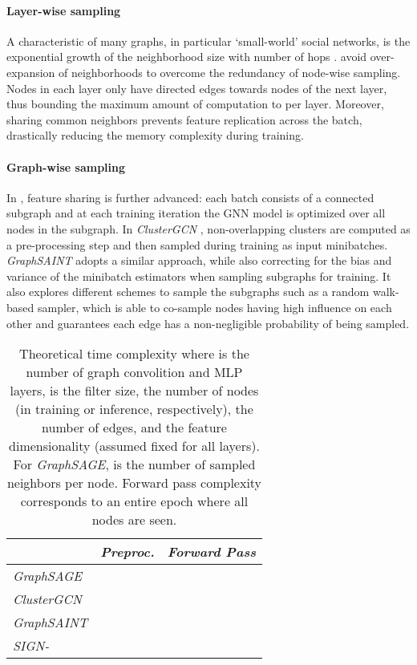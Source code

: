\documentclass{article}
\begin{document}
\paragraph{Layer-wise sampling} A characteristic of many graphs, in particular `small-world'  social networks, is the exponential growth of the neighborhood size with number of hops . \cite{fastgcn, adaptive-sampling} avoid over-expansion of neighborhoods to overcome the redundancy of node-wise sampling. Nodes in each layer only have directed edges towards nodes of the next layer, thus bounding the maximum amount of computation to  per layer. Moreover, sharing common neighbors prevents feature replication across the batch, drastically reducing the memory complexity during training.

\paragraph{Graph-wise sampling} In \cite{Chiang:2019:CEA:3292500.3330925, DBLP:journals/corr/abs-1907-04931}, feature sharing is further advanced: each batch consists of a connected subgraph and at each training iteration the GNN model is optimized over all nodes in the subgraph.
In \textit{ClusterGCN} \cite{Chiang:2019:CEA:3292500.3330925}, non-overlapping clusters are computed as a pre-processing step and then sampled during training as input minibatches. \textit{GraphSAINT} \cite{DBLP:journals/corr/abs-1907-04931} adopts a similar approach, while also correcting for the bias and variance of the minibatch estimators when sampling subgraphs for training. It also explores different schemes to sample the subgraphs such as a random walk-based sampler, which is able to co-sample nodes having high influence on each other and guarantees each edge has a non-negligible probability of being sampled.

\begin{table}
\caption{Theoretical time complexity where  is the number of graph convolition and MLP layers,  is the filter size,  the number of nodes (in training or inference,  respectively),  the number of edges, and  the feature dimensionality (assumed fixed for all layers). For \textit{GraphSAGE},  is the number of sampled neighbors per node. Forward pass complexity corresponds to an entire epoch where all nodes are seen.}
    \label{tab:complexity}
    \centering
    \begin{tabular}{| l | cc |}
    \hline
     & \textit{Preproc.} & \textit{Forward Pass} \\ \hline
    \textit{GraphSAGE}  &  &   \\ 
    \textit{ClusterGCN}  &  &  \\ 
    \textit{GraphSAINT} &  &  \\ 
    \hline
    \textit{SIGN-} &  &  \\  
    \hline
    \end{tabular} 
\end{table}
\end{document}
